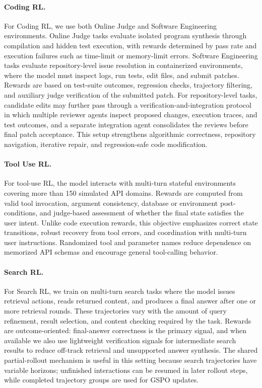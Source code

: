 \documentclass{article} %
\begin{document}
\paragraph{Coding RL.}
For Coding RL, we use both Online Judge and Software Engineering environments. Online Judge tasks evaluate isolated program synthesis through compilation and hidden test execution, with rewards determined by pass rate and execution failures such as time-limit or memory-limit errors. Software Engineering tasks evaluate repository-level issue resolution in containerized environments, where the model must inspect logs, run tests, edit files, and submit patches. Rewards are based on test-suite outcomes, regression checks, trajectory filtering, and auxiliary judge verification of the submitted patch. For repository-level tasks, candidate edits may further pass through a verification-and-integration protocol in which multiple reviewer agents inspect proposed changes, execution traces, and test outcomes, and a separate integration agent consolidates the reviews before final patch acceptance. This setup strengthens algorithmic correctness, repository navigation, iterative repair, and regression-safe code modification.

\paragraph{Tool Use RL.}
For tool-use RL, the model interacts with multi-turn stateful environments covering more than 150 simulated API domains. Rewards are computed from valid tool invocation, argument consistency, database or environment post-conditions, and judge-based assessment of whether the final state satisfies the user intent. Unlike code execution rewards, this objective emphasizes correct state transitions, robust recovery from tool errors, and coordination with multi-turn user instructions. Randomized tool and parameter names reduce dependence on memorized API schemas and encourage general tool-calling behavior.

\paragraph{Search RL.}
For Search RL, we train on multi-turn search tasks where the model issues retrieval actions, reads returned content, and produces a final answer after one or more retrieval rounds. These trajectories vary with the amount of query refinement, result selection, and content checking required by the task. Rewards are outcome-oriented: final-answer correctness is the primary signal, and when available we also use lightweight verification signals for intermediate search results to reduce off-track retrieval and unsupported answer synthesis. The shared partial-rollout mechanism is useful in this setting because search trajectories have variable horizons; unfinished interactions can be resumed in later rollout steps, while completed trajectory groups are used for GSPO updates.
\end{document}
